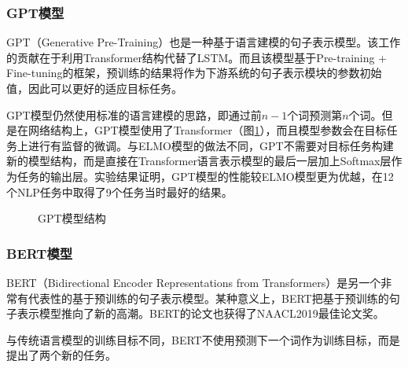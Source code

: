 
\subsubsection{GPT模型}

\parinterval  GPT（Generative Pre-Training）也是一种基于语言建模的句子表示模型\cite{radford2018improving}。该工作的贡献在于利用Transformer结构代替了LSTM。而且该模型基于Pre-training + Fine-tuning的框架，预训练的结果将作为下游系统的句子表示模块的参数初始值，因此可以更好的适应目标任务。

\parinterval  GPT模型仍然使用标准的语言建模的思路，即通过前$ n-1 $个词预测第$ n $个词。但是在网络结构上，GPT模型使用了Transformer（图\ref{fig:5-71}），而且模型参数会在目标任务上进行有监督的微调。与ELMO模型的做法不同，GPT不需要对目标任务构建新的模型结构，而是直接在Transformer语言表示模型的最后一层加上Softmax层作为任务的输出层。实验结果证明，GPT模型的性能较ELMO模型更为优越，在12个NLP任务中取得了9个任务当时最好的结果。

\begin{figure}[htp]
\centering

\caption{GPT模型结构}
\label{fig:5-71}
\end{figure}
\vspace{-0.5em}

\subsubsection{BERT模型}

\parinterval  BERT（Bidirectional Encoder Representations from Transformers）是另一个非常有代表性的基于预训练的句子表示模型\cite{DBLP:conf/naacl/DevlinCLT19}。某种意义上，BERT把基于预训练的句子表示模型推向了新的高潮。BERT的论文也获得了NAACL2019最佳论文奖。

\parinterval  与传统语言模型的训练目标不同，BERT不使用预测下一个词作为训练目标，而是提出了两个新的任务。

